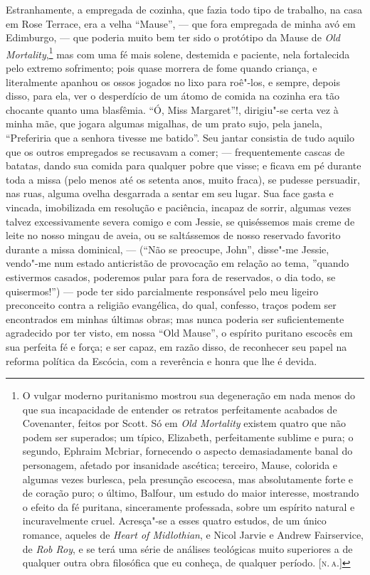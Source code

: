 Estranhamente, a empregada de cozinha, que fazia todo tipo de
trabalho, na casa em Rose Terrace, era a velha ``Mause'', --- que fora
empregada de minha avó em Edimburgo, --- que poderia muito bem ter sido o
protótipo da Mause de \textit{Old Mortality},\footnote{O vulgar
  moderno puritanismo mostrou sua degeneração em nada menos do que sua
  incapacidade de entender os retratos perfeitamente acabados de
  Covenanter, feitos por Scott. Só em \textit{Old Mortality} existem
  quatro que não podem ser superados; um típico, Elizabeth,
  perfeitamente sublime e pura; o segundo, Ephraim Mcbriar, fornecendo o
  aspecto demasiadamente banal do personagem, afetado por insanidade
  ascética; terceiro, Mause, colorida e algumas vezes burlesca, pela
  presunção escocesa, mas absolutamente forte e de coração puro; o
  último, Balfour, um estudo do maior interesse, mostrando o efeito da
  fé puritana, sinceramente professada, sobre um espírito natural e
  incuravelmente cruel. Acresça"-se a esses quatro estudos, de um único
  romance, aqueles de \textit{Heart of Midlothian}, e Nicol Jarvie e
  Andrew Fairservice, de \textit{Rob Roy}, e se terá uma série de análises
  teológicas muito superiores a de qualquer outra obra filosófica que eu
  conheça, de qualquer período. {[}\textsc{n.\,a.}{]}} mas com uma fé
mais solene, destemida e paciente, nela fortalecida pelo extremo
sofrimento; pois quase morrera de fome quando criança, e literalmente
apanhou os ossos jogados no lixo para roê"-los, e sempre, depois disso,
para ela, ver o desperdício de um átomo de comida na cozinha era tão
chocante quanto uma blasfêmia. ``Ó, Miss Margaret''!, dirigiu"-se certa
vez à minha mãe, que jogara algumas migalhas, de um prato sujo, pela
janela, ``Preferiria que a senhora tivesse me batido''. Seu jantar
consistia de tudo aquilo que os outros empregados se recusavam a comer;
--- frequentemente cascas de batatas, dando sua comida para qualquer pobre
que visse; e ficava em pé durante toda a missa (pelo menos até os
setenta anos, muito fraca), se pudesse persuadir, nas ruas, alguma
ovelha desgarrada a sentar em seu lugar. Sua face gasta e vincada,
imobilizada em resolução e paciência, incapaz de sorrir, algumas vezes
talvez excessivamente severa comigo e com Jessie, se quiséssemos mais
creme de leite no nosso mingau de aveia, ou se saltássemos de nosso
reservado favorito durante a missa dominical, --- (``Não se preocupe,
John'', disse"-me Jessie, vendo"-me num estado anticristão de provocação
em relação ao tema, ''quando estivermos casados, poderemos pular para
fora de reservados, o dia todo, se quisermos!'') --- pode ter sido
parcialmente responsável pelo meu ligeiro preconceito contra a religião
evangélica, do qual, confesso, traços podem ser encontrados em minhas
últimas obras; mas nunca poderia ser suficientemente agradecido por ter
visto, em nossa ``Old Mause'', o espírito puritano escocês em sua
perfeita fé e força; e ser capaz, em razão disso, de reconhecer seu
papel na reforma política da Escócia, com a reverência e honra que lhe é
devida.

